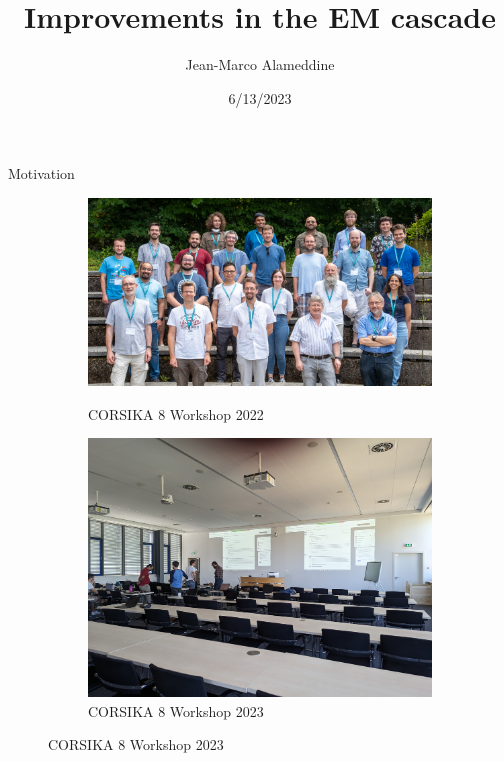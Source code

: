 \documentclass[aspectratio=1610, 9pt]{beamer}
\title{Improvements in the EM cascade}
\author[jean-marco.alameddine@tu-dortmund.de]{Jean-Marco Alameddine}
\institute[]{CORSIKA 8 Workshop 2023}
\date[]{6/13/2023}
\begin{document}
\maketitle

\begin{frame}{Motivation}

\begin{figure}
    \begin{figure}[ht]
        \begin{minipage}[b]{0.4\linewidth}
            \centering
            \includegraphics[width=\textwidth]{images/photo_2022.jpg}
            \caption*{CORSIKA 8 Workshop 2022}
            \label{fig:a}
        \end{minipage}
        \begin{minipage}[t]{0.15\linewidth}
          \vspace{-25mm}
          \centering
          \Huge\textbf{\rightarrow}
        \end{minipage}        
        \begin{minipage}[b]{0.4\linewidth}
            \centering
            \includegraphics[width=\textwidth]{images/photo_2023_prelim.jpg}
            \caption*{CORSIKA 8 Workshop 2023}
            \label{fig:b}
        \end{minipage}
    \end{figure}
\end{figure}


\end{frame}
\end{document}
